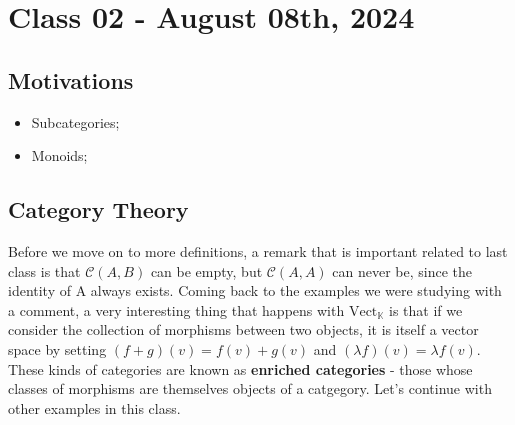 \documentclass[../category_theory.tex]{subfiles}
\begin{document}
\section{Class 02 - August 08th, 2024}
\subsection{Motivations}
\begin{itemize}
	\item Subcategories;
	\item Monoids;
\end{itemize}
\subsection{Category Theory}
Before we move on to more definitions, a remark that is important related to last class is that \(\mathcal{C}(A, B)\) can be empty, but \(\mathcal{C}(A, A)\) can never be, since the identity of A always exists. Coming back to the examples  we were studying with a comment, a very interesting thing that happens with \(\mathrm{Vect}_{\mathbb{K}}\) is that if we consider the collection of morphisms between two objects, it is itself a vector space by setting \((f+g)(v) = f(v)+g(v)\) and \((\lambda f)(v)=\lambda f(v)\). These kinds of categories are known as \textbf{enriched categories} - those whose classes of morphisms are themselves objects of a catgegory. Let's continue with other examples in this class.
\end{document}
